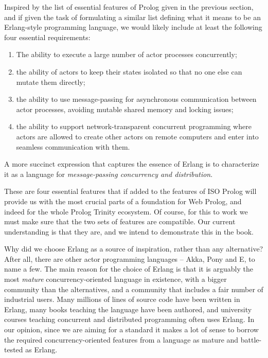 Inspired by the list of essential features of Prolog given in the previous section, and if given the task of formulating a similar list defining what it means to be an Erlang-style programming language, we would likely include at least the following four essential requirements:

\begin{enumerate}
\item
  The ability to execute a large number of actor processes concurrently;
\item 
  the ability of actors to keep their states isolated so that no one else can mutate them directly;
\item
  the ability to use message-passing for asynchronous communication between actor processes, avoiding mutable shared memory and locking issues;
\item
  the ability to support network-transparent concurrent programming where actors are allowed to create other actors on remote computers and enter into seamless communication with them.
\end{enumerate}

\noindent A more succinct expression that captures the essence of Erlang is to characterize it as a language for \textit{message-passing concurrency and distribution}.

These are four essential features that if added to the features of ISO Prolog will provide us with the most crucial parts of a foundation for Web Prolog, and indeed for the whole Prolog Trinity ecosystem. Of course, for this to work we must make sure that the two sets of features are compatible. Our current understanding is that they are, and we intend to demonstrate this in the book.

Why did we choose Erlang as a source of inspiration, rather than any alternative? After all, there are other actor programming languages -- Akka, Pony and E, to name a few. The main reason for the choice of Erlang is that it is arguably the most \textit{mature} concurrency-oriented language in existence, with a bigger community than the alternatives, and a community that includes a fair number of industrial users. Many millions of lines of source code have been written in Erlang, many books teaching the language have been authored, and university courses teaching concurrent and distributed programming often uses Erlang. In our opinion, since we are aiming for a standard it makes a lot of sense to borrow the required concurrency-oriented features from a language as mature and battle-tested  as Erlang.

